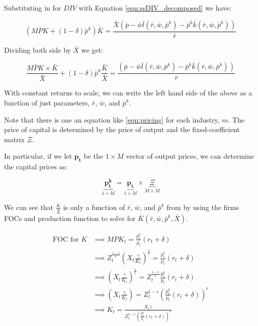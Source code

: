 \documentclass[letterpaper,12pt]{article}
\theoremstyle{definition}
\begin{document}
\begin{spacing}{1.5}
Substituting in for $\overline{DIV}$ with Equation \ref{eqn:ssDIV_decomposed} we have:

\begin{equation}
\left(\overline{MPK} + (1-\delta)\bar{p}^{k}\right)\bar{K} =  \frac{\bar{X}\left(\bar{p} - \bar{w}\bar{l}(\bar{r},\bar{w},\bar{p}^{k}) - \bar{p}^{k}\bar{k}(\bar{r},\bar{w},\bar{p}^{k})\right)}{\bar{r}}
\end{equation} 

Dividing both side by $\bar{X}$ we get:


\begin{equation}
\label{eqn:pricing}
\frac{\overline{MPK} \times \bar{K}}{\bar{X}} + (1-\delta)\bar{p}^{k}\frac{\bar{K}}{\bar{X}} =  \frac{\left(\bar{p} - \bar{w}\bar{l}(\bar{r},\bar{w},\bar{p}^{k}) - \bar{p}^{k}\bar{k}(\bar{r},\bar{w},\bar{p}^{k})\right)}{\bar{r}}
\end{equation} 

With constant returns to scale, we can write the left hand side of the above as a function of just parameters, $\bar{r}$, $\bar{w}$, and $\bar{p}^{k}$.

Note that there is one an equation like \ref{eqn:pricing} for each industry, $m$.  The price of capital is determined by the price of output and the fixed-coefficient matrix $\Xi$.

In particular, if we let $\boldsymbol{p_{t}}$ be the $1\times M$ vector of output prices, we can determine the capital prices as:

\begin{equation}
\label{eqn:capital_prices}
\underbrace{\boldsymbol{p^{k}_{t}}}_{1\times M} =\underbrace{\boldsymbol{p_{t}}}_{1\times M} \times  \underbrace{\Xi}_{M\times M}
\end{equation}

We can see that $\frac{\bar{K}}{\bar{X}}$ is only a function of $\bar{r}$, $\bar{w}$, and $\bar{p}^{k}$ from by using the firms FOCs and production function to solve for $\bar{K}(\bar{r},\bar{w},\bar{p}^{k},\bar{X})$.

\begin{equation}
\begin{split}
\text{FOC for $K$}& \implies MPK_{t} = \frac{p^{k}_{t}}{p_{t}}(r_{t}+\delta)\\
& \implies Z_{t}^{\frac{\epsilon-1}{\epsilon}}\left(X_{t}\frac{\gamma}{K_{t}}\right)^{\frac{1}{\epsilon}} = \frac{p^{k}_{t}}{p_{t}}(r_{t}+\delta)\\
& \implies\left(X_{t}\frac{\gamma}{K_{t}}\right)^{\frac{1}{\epsilon}} =  Z_{t}^{\frac{1-\epsilon}{\epsilon}}\frac{p^{k}_{t}}{p_{t}}(r_{t}+\delta) \\
& \implies\left(X_{t}\frac{\gamma}{K_{t}}\right) =  Z_{t}^{1-\epsilon}\left(\frac{p^{k}_{t}}{p_{t}}(r_{t}+\delta)\right)^{\epsilon} \\
& \implies K_{t} = \frac{X_{t}\gamma}{Z_{t}^{1-\epsilon}\left(\frac{p^{k}_{t}}{p_{t}}(r_{t}+\delta)\right)^{\epsilon}} \\
\end{split}
\end{equation}


\end{spacing}
\end{document}
